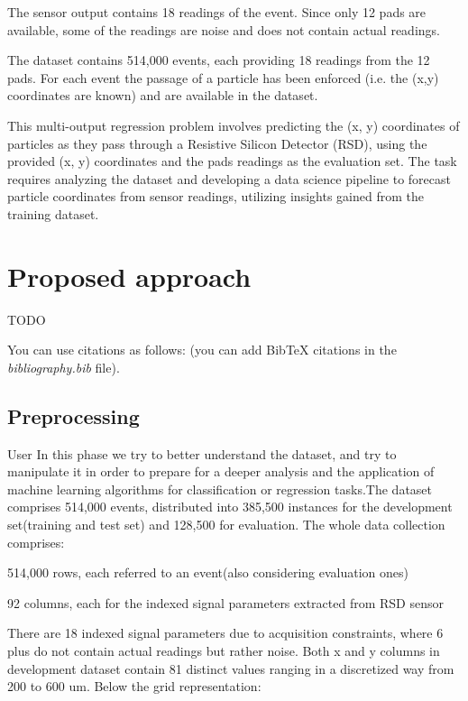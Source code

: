 \documentclass[conference]{IEEEtran}
\begin{document}
The sensor output contains 18 readings of the event. Since only 12 pads are available, some of the 
readings are noise and does not contain actual readings.

The dataset contains 514,000 events, each providing 18 readings from the 12 pads. 
For each event the passage of a particle has been enforced (i.e. the (x,y) coordinates are known) and are available in the dataset.

This multi-output regression problem involves predicting the (x, y) coordinates of particles as they 
pass through a Resistive Silicon Detector (RSD), using the provided (x, y) coordinates and the 
pads readings as the evaluation set. 
The task requires analyzing the dataset and developing a data science pipeline to forecast particle 
coordinates from sensor readings, utilizing insights gained from the training dataset.


\section{Proposed approach}
TODO

You can use citations as follows: \cite{goodfellow2016deep} (you can add BibTeX citations in the \textit{bibliography.bib} file).


\subsection{Preprocessing}
User
In this phase we try to better understand the dataset, and try to manipulate it in order to prepare  for a deeper analysis  and the application of machine learning algorithms for classification or regression tasks.The dataset comprises 514,000 events, distributed into 385,500 instances for the development set(training and test set) and 128,500 for evaluation. The whole data collection comprises:

 514,000 rows, each referred to an event(also considering evaluation ones)
 
 92 columns, each for the indexed signal parameters extracted from RSD sensor

There are 18 indexed signal parameters  due to acquisition constraints, where 6 plus do not contain actual readings but rather noise.
Both x and y columns in development dataset contain 81 distinct values ranging in a discretized way from 200 to 600 um.
Below the grid representation: 
\end{document}
